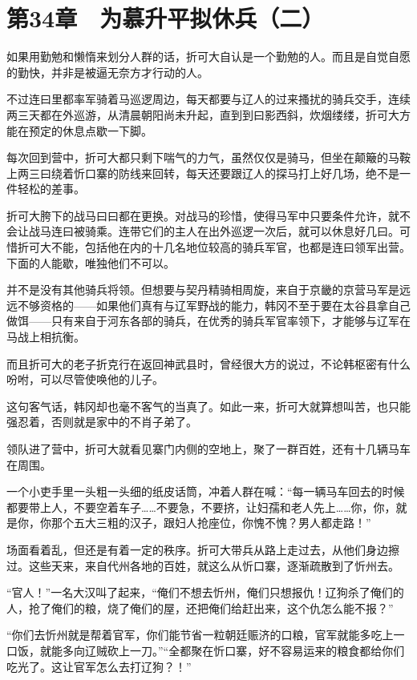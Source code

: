 \section{第34章　为慕升平拟休兵（二）}

如果用勤勉和懒惰来划分人群的话，折可大自认是一个勤勉的人。而且是自觉自愿的勤快，并非是被逼无奈方才行动的人。

不过连曰里都率军骑着马巡逻周边，每天都要与辽人的过来搔扰的骑兵交手，连续两三天都在外巡游，从清晨朝阳尚未升起，直到到曰影西斜，炊烟缕缕，折可大方能在预定的休息点歇一下脚。

每次回到营中，折可大都只剩下喘气的力气，虽然仅仅是骑马，但坐在颠簸的马鞍上两三曰绕着忻口寨的防线来回转，每天还要跟辽人的探马打上好几场，绝不是一件轻松的差事。

折可大胯下的战马曰曰都在更换。对战马的珍惜，使得马军中只要条件允许，就不会让战马连曰被骑乘。连带它们的主人在出外巡逻一次后，就可以休息好几曰。可惜折可大不能，包括他在内的十几名地位较高的骑兵军官，也都是连曰领军出营。下面的人能歇，唯独他们不可以。

并不是没有其他骑兵将领。但想要与契丹精骑相周旋，来自于京畿的京营马军是远远不够资格的——如果他们真有与辽军野战的能力，韩冈不至于要在太谷县拿自己做饵——只有来自于河东各部的骑兵，在优秀的骑兵军官率领下，才能够与辽军在马战上相抗衡。

而且折可大的老子折克行在返回神武县时，曾经很大方的说过，不论韩枢密有什么吩咐，可以尽管使唤他的儿子。

这句客气话，韩冈却也毫不客气的当真了。如此一来，折可大就算想叫苦，也只能强忍着，否则就是家中的不肖子弟了。

领队进了营中，折可大就看见寨门内侧的空地上，聚了一群百姓，还有十几辆马车在周围。

一个小吏手里一头粗一头细的纸皮话筒，冲着人群在喊：“每一辆马车回去的时候都要带上人，不要空着车子……不要急，不要挤，让妇孺和老人先上……你，你，就是你，你那个五大三粗的汉子，跟妇人抢座位，你愧不愧？男人都走路！”

场面看着乱，但还是有着一定的秩序。折可大带兵从路上走过去，从他们身边擦过。这些天来，来自代州各地的百姓，就这么从忻口寨，逐渐疏散到了忻州去。

“官人！”一名大汉叫了起来，“俺们不想去忻州，俺们只想报仇！辽狗杀了俺们的人，抢了俺们的粮，烧了俺们的屋，还把俺们给赶出来，这个仇怎么能不报？”

“你们去忻州就是帮着官军，你们能节省一粒朝廷赈济的口粮，官军就能多吃上一口饭，就能多向辽贼砍上一刀。”“全都聚在忻口寨，好不容易运来的粮食都给你们吃光了。这让官军怎么去打辽狗？！”

